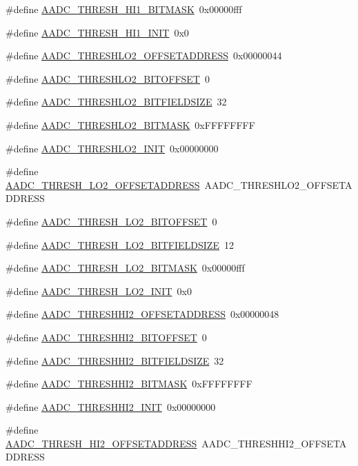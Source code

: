 \begin{DoxyCompactItemize}
\#define \hyperlink{a00543_a069ece20cbd2160c99b6421288280dc5}{AADC\_\-THRESH\_\-HI1\_\-BITMASK}~0x00000fff
\item 
\#define \hyperlink{a00543_a2ee1a22f0c20c6e04a5f9a22cc3b9207}{AADC\_\-THRESH\_\-HI1\_\-INIT}~0x0
\item 
\#define \hyperlink{a00543_a7ab9b74ae5f69e5e7a3cf796511d96c6}{AADC\_\-THRESHLO2\_\-OFFSETADDRESS}~0x00000044
\item 
\#define \hyperlink{a00543_a49e65d27e65fe6352d8ea7076f4792cb}{AADC\_\-THRESHLO2\_\-BITOFFSET}~0
\item 
\#define \hyperlink{a00543_a375f054749f151c0b957ac926f059382}{AADC\_\-THRESHLO2\_\-BITFIELDSIZE}~32
\item 
\#define \hyperlink{a00543_aeed2c2fbcf77b1e61df50654c8a10717}{AADC\_\-THRESHLO2\_\-BITMASK}~0xFFFFFFFF
\item 
\#define \hyperlink{a00543_a226e67f47470d84e352ee50344c8065a}{AADC\_\-THRESHLO2\_\-INIT}~0x00000000
\item 
\#define \hyperlink{a00543_a6ed27376a84f4781785e64c2426acff7}{AADC\_\-THRESH\_\-LO2\_\-OFFSETADDRESS}~AADC\_\-THRESHLO2\_\-OFFSETADDRESS
\item 
\#define \hyperlink{a00543_a6aa7449ea7eb7f08d1c5beab79283c17}{AADC\_\-THRESH\_\-LO2\_\-BITOFFSET}~0
\item 
\#define \hyperlink{a00543_acb7cf2d6c28a5be7dc147d30a7fa4e1c}{AADC\_\-THRESH\_\-LO2\_\-BITFIELDSIZE}~12
\item 
\#define \hyperlink{a00543_a4537ead16b49ccfeb1709d50881bf87c}{AADC\_\-THRESH\_\-LO2\_\-BITMASK}~0x00000fff
\item 
\#define \hyperlink{a00543_a24a0bfc026cfa80271958cf9f9f99b9d}{AADC\_\-THRESH\_\-LO2\_\-INIT}~0x0
\item 
\#define \hyperlink{a00543_ac81fc585042d09ca22759a620fc83b78}{AADC\_\-THRESHHI2\_\-OFFSETADDRESS}~0x00000048
\item 
\#define \hyperlink{a00543_ae09cc51bf9d7bd6c9a98af7fa007fba5}{AADC\_\-THRESHHI2\_\-BITOFFSET}~0
\item 
\#define \hyperlink{a00543_ab0e712409a05d751dc2b60bded214485}{AADC\_\-THRESHHI2\_\-BITFIELDSIZE}~32
\item 
\#define \hyperlink{a00543_ac5f6561a18cc6629e4a754fb23dcef8d}{AADC\_\-THRESHHI2\_\-BITMASK}~0xFFFFFFFF
\item 
\#define \hyperlink{a00543_a33e40e61b4c4c49465d929d9bdebc1e0}{AADC\_\-THRESHHI2\_\-INIT}~0x00000000
\item 
\#define \hyperlink{a00543_afa89ec040699c8df28e1e36c1ce35c49}{AADC\_\-THRESH\_\-HI2\_\-OFFSETADDRESS}~AADC\_\-THRESHHI2\_\-OFFSETADDRESS

\end{DoxyCompactItemize}
